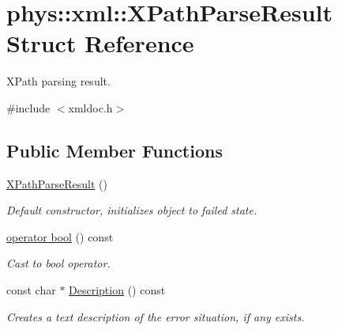 \hypertarget{structphys_1_1xml_1_1XPathParseResult}{
\section{phys::xml::XPathParseResult Struct Reference}
\label{d8/d54/structphys_1_1xml_1_1XPathParseResult}
}


XPath parsing result.  




{\ttfamily \#include $<$xmldoc.h$>$}

\subsection*{Public Member Functions}
\begin{DoxyCompactItemize}
\item 
\hypertarget{structphys_1_1xml_1_1XPathParseResult_ac41f4db5604d32679933be58bc74aa23}{
\hyperlink{structphys_1_1xml_1_1XPathParseResult_ac41f4db5604d32679933be58bc74aa23}{XPathParseResult} ()}
\label{d8/d54/structphys_1_1xml_1_1XPathParseResult_ac41f4db5604d32679933be58bc74aa23}

\begin{DoxyCompactList}\small\item\em Default constructor, initializes object to failed state. \item\end{DoxyCompactList}\item 
\hyperlink{structphys_1_1xml_1_1XPathParseResult_a8dddf12100a6c40f9abcd8c0b7b37816}{operator bool} () const 
\begin{DoxyCompactList}\small\item\em Cast to bool operator. \item\end{DoxyCompactList}\item 
const char $\ast$ \hyperlink{structphys_1_1xml_1_1XPathParseResult_a722e220fa91f9bc48357ade351b8b038}{Description} () const 
\begin{DoxyCompactList}\small\item\em Creates a text description of the error situation, if any exists. \item\end{DoxyCompactList}\end{DoxyCompactItemize}
